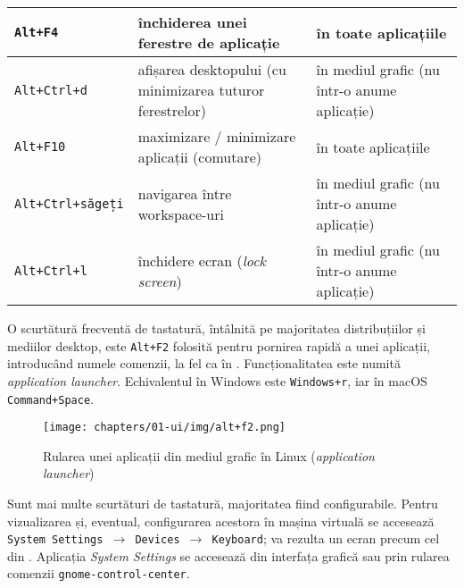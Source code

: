 \begin{table}[!htb]
{\begin{center}
\begin{tabular}{ p{} p{} p{} }
        \texttt{Alt+F4} &
        închiderea unei ferestre de aplicație &
        în toate aplicațiile \\
        \midrule

        \texttt{Alt+Ctrl+d} &
        afișarea desktopului (cu minimizarea tuturor ferestrelor) &
        în mediul grafic (nu într-o anume aplicație) \\
        \midrule

        \texttt{Alt+F10} &
        maximizare / minimizare aplicații (comutare) &
        în toate aplicațiile \\
        \midrule

        \texttt{Alt+Ctrl+săgeți} &
        navigarea între workspace-uri &
        în mediul grafic (nu într-o anume aplicație) \\
        \midrule

        \texttt{Alt+Ctrl+l} &
        închidere ecran (\textit{lock screen}) &
        în mediul grafic (nu într-o anume aplicație) \\

      \bottomrule
    \end{tabular}
    \label{tab:ui:vm-shortcuts}
  \end{center}
  }
\end{table}

O scurtătură frecventă de tastatură, întâlnită pe majoritatea distribuțiilor și mediilor desktop, este \texttt{Alt+F2} folosită pentru pornirea rapidă a unei aplicații, introducând numele comenzii, la fel ca în . Funcționalitatea este numită \textit{application launcher}. Echivalentul în Windows este \texttt{Windows+r}, iar în macOS \texttt{Command+Space}.

\begin{figure}[!htbp]
  \centering
  \texttt{[image: chapters/01-ui/img/alt+f2.png]}
  \caption{Rularea unei aplicații din mediul grafic în Linux (\textit{application launcher})}
  \label{fig:ui:app-launcher}
\end{figure}

Sunt mai multe scurtături de tastatură, majoritatea fiind configurabile. Pentru vizualizarea și, eventual, configurarea acestora în mașina virtuală se accesează \texttt{System Settings $\rightarrow$ Devices $\rightarrow$ Keyboard}; va rezulta un ecran precum cel din . Aplicația \textit{System Settings} se accesează din interfața grafică sau prin rularea comenzii \texttt{gnome-control-center}.

